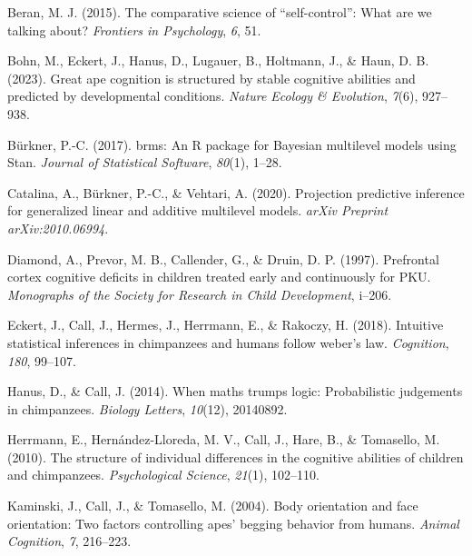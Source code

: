\documentclass[
  man,floatsintext]{apa6}
\newlength{\cslhangindent}
\newlength{\cslentryspacingunit} %
\newenvironment{CSLReferences}[2] %
 {%
  \setlength{\parindent}{0pt}
  \ifodd #1
  \let\oldpar\par
  \def\par{\hangindent=\cslhangindent\oldpar}
  \fi
  \setlength{\parskip}{#2\cslentryspacingunit}
 }%
 {}
\begin{document}
\hypertarget{refs}{}
\begin{CSLReferences}{1}{0}
\leavevmode{}%
Beran, M. J. (2015). The comparative science of {``self-control''}: What are we talking about? \emph{Frontiers in Psychology}, \emph{6}, 51.

\leavevmode{}%
Bohn, M., Eckert, J., Hanus, D., Lugauer, B., Holtmann, J., \& Haun, D. B. (2023). Great ape cognition is structured by stable cognitive abilities and predicted by developmental conditions. \emph{Nature Ecology \& Evolution}, \emph{7}(6), 927--938.

\leavevmode{}%
Bürkner, P.-C. (2017). {brms}: An {R} package for {Bayesian} multilevel models using {Stan}. \emph{Journal of Statistical Software}, \emph{80}(1), 1--28.

\leavevmode{}%
Catalina, A., Bürkner, P.-C., \& Vehtari, A. (2020). Projection predictive inference for generalized linear and additive multilevel models. \emph{arXiv Preprint arXiv:2010.06994}.

\leavevmode{}%
Diamond, A., Prevor, M. B., Callender, G., \& Druin, D. P. (1997). Prefrontal cortex cognitive deficits in children treated early and continuously for PKU. \emph{Monographs of the Society for Research in Child Development}, i--206.

\leavevmode{}%
Eckert, J., Call, J., Hermes, J., Herrmann, E., \& Rakoczy, H. (2018). Intuitive statistical inferences in chimpanzees and humans follow weber's law. \emph{Cognition}, \emph{180}, 99--107.

\leavevmode{}%
Hanus, D., \& Call, J. (2014). When maths trumps logic: Probabilistic judgements in chimpanzees. \emph{Biology Letters}, \emph{10}(12), 20140892.

\leavevmode{}%
Herrmann, E., Hernández-Lloreda, M. V., Call, J., Hare, B., \& Tomasello, M. (2010). The structure of individual differences in the cognitive abilities of children and chimpanzees. \emph{Psychological Science}, \emph{21}(1), 102--110.

\leavevmode{}%
Kaminski, J., Call, J., \& Tomasello, M. (2004). Body orientation and face orientation: Two factors controlling apes' begging behavior from humans. \emph{Animal Cognition}, \emph{7}, 216--223.


\end{CSLReferences}
\end{document}
